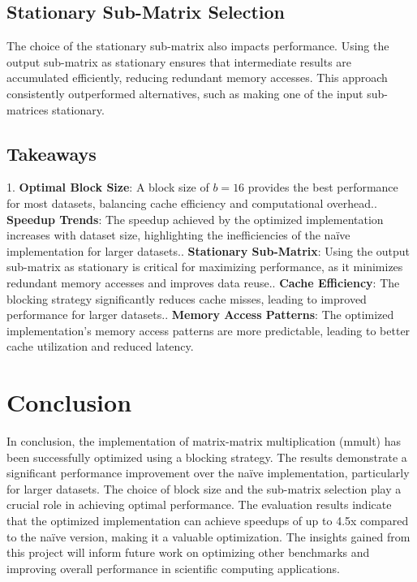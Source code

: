 \documentclass[12pt]{article}
\begin{document}
    \subsection{Stationary Sub-Matrix Selection}
    The choice of the stationary sub-matrix also impacts performance. Using the output sub-matrix as stationary ensures that intermediate results are accumulated efficiently, reducing redundant memory accesses. This approach consistently outperformed alternatives, such as making one of the input sub-matrices stationary.

    \subsection{Takeaways}
    1. \textbf{Optimal Block Size}: A block size of \( b = 16 \) provides the best performance for most datasets, balancing cache efficiency and computational overhead.. \textbf{Speedup Trends}: The speedup achieved by the optimized implementation increases with dataset size, highlighting the inefficiencies of the naïve implementation for larger datasets.. \textbf{Stationary Sub-Matrix}: Using the output sub-matrix as stationary is critical for maximizing performance, as it minimizes redundant memory accesses and improves data reuse.. \textbf{Cache Efficiency}: The blocking strategy significantly reduces cache misses, leading to improved performance for larger datasets.. \textbf{Memory Access Patterns}: The optimized implementation's memory access patterns are more predictable, leading to better cache utilization and reduced latency.




\section{Conclusion}
In conclusion, the implementation of matrix-matrix multiplication (mmult) has been successfully optimized using a blocking strategy. The results demonstrate a significant performance improvement over the naïve implementation, particularly for larger datasets. The choice of block size and the sub-matrix selection play a crucial role in achieving optimal performance.
The evaluation results indicate that the optimized implementation can achieve speedups of up to 4.5x compared to the naïve version, making it a valuable optimization. The insights gained from this project will inform future work on optimizing other benchmarks and improving overall performance in scientific computing applications.
\end{document}
